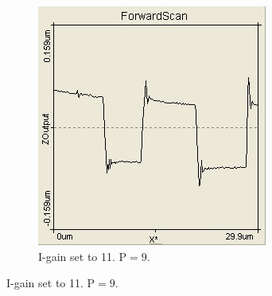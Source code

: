 \documentclass[paper=a4,fontsize=10pt,DIV=18,twocolumn,parskip=half]{scrartcl}
\numberwithin{equation}{section}    %
\begin{document}
\begin{figure}
\begin{subfigure}{0.45\columnwidth}
        \includegraphics[width=\textwidth]{Bilder/vielI}
        \caption{I-gain set to 11. 
        $\mathrm{P}=9$.}
        \label{vielI}
    \end{subfigure}
     

\end{figure}
\end{document}
